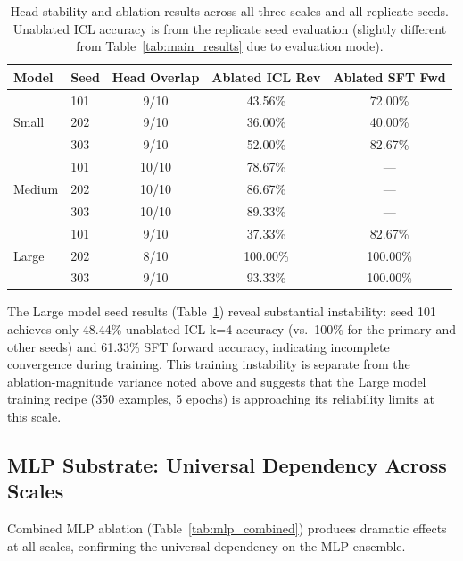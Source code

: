 \documentclass[11pt]{article}
\begin{document}
\begin{table}[H]
\centering
\caption{Head stability and ablation results across all three scales and all
replicate seeds. Unablated ICL accuracy is from the replicate seed evaluation
(slightly different from Table~\ref{tab:main_results} due to evaluation mode).}
\label{tab:stability_cross_scale}
\begin{tabular}{llccc}
\toprule
\textbf{Model} & \textbf{Seed} & \textbf{Head Overlap} & \textbf{Ablated ICL Rev} & \textbf{Ablated SFT Fwd} \\
\midrule
\multirow{3}{*}{Small}  & 101 & 9/10 & 43.56\% & 72.00\% \\
                        & 202 & 9/10 & 36.00\% & 40.00\% \\
                        & 303 & 9/10 & 52.00\% & 82.67\% \\
\midrule
\multirow{3}{*}{Medium} & 101 & 10/10 & 78.67\% & --- \\
                        & 202 & 10/10 & 86.67\% & --- \\
                        & 303 & 10/10 & 89.33\% & --- \\
\midrule
\multirow{3}{*}{Large}  & 101 &  9/10 & 37.33\% & 82.67\% \\
                        & 202 &  8/10 & 100.00\% & 100.00\% \\
                        & 303 &  9/10 & 93.33\% & 100.00\% \\
\bottomrule
\end{tabular}
\end{table}

The Large model seed results (Table~\ref{tab:stability_cross_scale}) reveal
substantial instability: seed 101 achieves only 48.44\% unablated ICL k=4
accuracy (vs.\ 100\% for the primary and other seeds) and 61.33\% SFT forward
accuracy, indicating incomplete convergence during training. This training
instability is separate from the ablation-magnitude variance noted above and
suggests that the Large model training recipe (350 examples, 5 epochs) is
approaching its reliability limits at this scale.

\subsection{MLP Substrate: Universal Dependency Across Scales}

Combined MLP ablation (Table~\ref{tab:mlp_combined}) produces dramatic effects
at all scales, confirming the universal dependency on the MLP ensemble.
\end{document}
